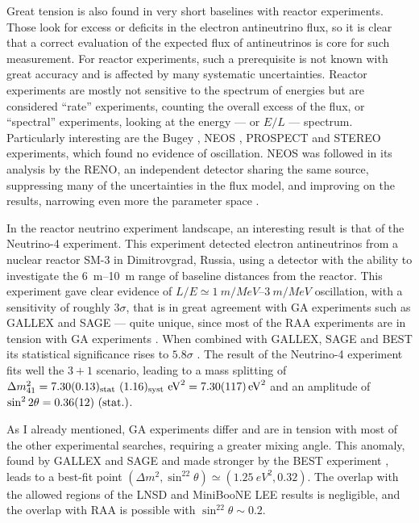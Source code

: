 Great tension is also found in very short baselines with reactor experiments. Those look for excess or deficits in the electron antineutrino flux, so it is clear that a correct evaluation of the expected flux of antineutrinos is core for such measurement. For reactor experiments, such a prerequisite is not known with great accuracy and is affected by many systematic uncertainties. Reactor experiments are mostly not sensitive to the spectrum of energies but are considered ``rate'' experiments, counting the overall excess of the flux, or ``spectral'' experiments, looking at the energy --- or $E/L$ --- spectrum. Particularly interesting are the Bugey \cite{declaisSearchNeutrinoOscillations1995}, NEOS \cite{koSterileNeutrinoSearch2017}, PROSPECT \cite{andriamiradoImprovedShortBaselineNeutrino2020} and STEREO \cite{almazanSTEREONeutrinoSpectrum2023} experiments, which found no evidence of oscillation. NEOS was followed in its analysis by the RENO, an independent detector sharing the same source, suppressing many of the uncertainties in the flux model, and improving on the results, narrowing even more the parameter space \cite{atifSearchSterileNeutrino2022}. 

In the reactor neutrino experiment landscape, an interesting result is that of the Neutrino-4 experiment. This experiment detected electron antineutrinos from a nuclear reactor SM-3 in Dimitrovgrad, Russia, using a detector with the ability to investigate the \qtyrange{6}{10}{m} range of baseline distances from the reactor. This experiment gave clear evidence of $L/E \simeq \qtyrange{1}{3}{m/MeV}$ oscillation, with a sensitivity of roughly $3\sigma$, that is in great agreement with GA experiments such as GALLEX and SAGE --- quite unique, since most of the RAA experiments are in tension with GA experiments \cite{maltoniEVSterileNeutrinos2024}. When combined with GALLEX, SAGE and BEST its statistical significance rises to $5.8\sigma$ \cite{serebrovResultNeutrino4Experiment2023}. The result of the Neutrino-4 experiment fits well the $3+1$ scenario, leading to a mass splitting of $\Delta m^2_{41} = \mathrm{7.30 (0.13)_{stat}\ (1.16)_{syst}}\ \si{eV^2} = \SI{7.30+-1.17}{eV^2}$ and an amplitude of $\sin^22\theta = \num{0.36\pm0.12}\mathrm{\ (stat.)}$. 

As I already mentioned, GA experiments differ and are in tension with most of the other experimental searches, requiring a greater mixing angle. This anomaly, found by GALLEX and SAGE and made stronger by the BEST experiment \cite{giuntiGalliumAnomalyCritical2022}, leads to a best-fit point $(\Delta m^2, \sin^22\theta) \simeq (\SI{1.25}{eV^2}, \num{0.32})$. The overlap with the allowed regions of the LNSD and MiniBooNE LEE results is negligible, and the overlap with RAA is possible with $\sin^22\theta\sim0.2$. 


